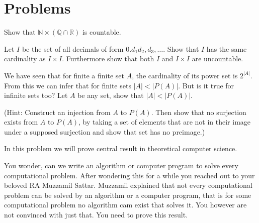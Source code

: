 \documentclass[a4paper]{exam}
\begin{document}
\section*{Problems}
\begin{questions}
    \question Show that $\mathbb{N} \times (\mathbb{Q} \cap \mathbb{R})$ is countable.
    \begin{solution}
    \end{solution}

    \question Let $I$ be the set of all decimals of form $0.d_1d_2,d_3, \dots$. Show that $I$ has the same cardinality as $I \times I$. Furthermore show that both $I$ and $I\times I$ are uncountable.
    \begin{solution}
    \end{solution}

    \question We have seen that for finite a finite set $A$, the cardinality of its power set is $2^{|A|}$. From this we can infer that for finite sets $|A| < |P(A)|$. But is it true for infinite sets too? Let $A$ be any set, show that $|A| < |P(A)|$. 
    
    (Hint: Construct an injection from $A$ to $P(A)$. Then show that no surjection exists from $A$ to $P(A)$, by taking a set of elements that are not in their image under a supposed surjection and show that set has no preimage.)
    \begin{solution}
    \end{solution}


    \question In this problem we will prove central result in theoretical computer science. 
    
    You wonder, can we write an algorithm or computer program to solve every computational problem. After wondering this for a while you reached out to your beloved RA Muzzamil Sattar. Muzzamil explained that not every computational problem can be solved by an algorithm or a computer program, that is for some computational problem no algorithm cam exist that solves it. You however are not convinced with just that. You need to prove this result. 

\end{questions}
\end{document}
